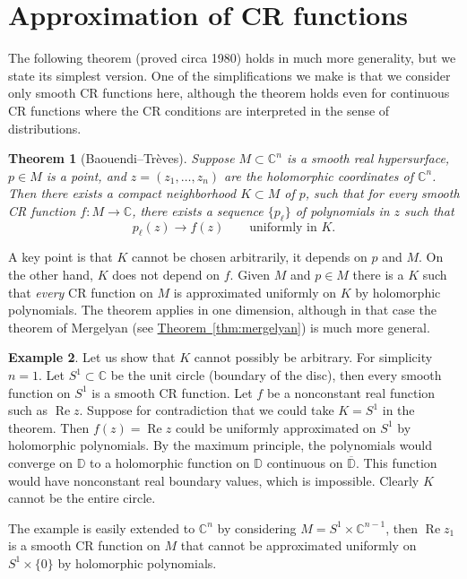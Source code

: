 \documentclass[12pt,openany]{book}
\renewcommand{\Re}{\operatorname{Re}}
\newcommand{\C}{{\mathbb{C}}}
\newcommand{\D}{{\mathbb{D}}}
\theoremstyle{plain}
\newtheorem{thm}{Theorem}[section]
\theoremstyle{remark}
\theoremstyle{definition}
\theoremstyle{exercise}
\theoremstyle{example}
\newtheorem{example}[thm]{Example}
\newcommand{\thmref}[1]{\hyperref[#1]{Theorem~\ref*{#1}}}
\begin{document}
\section{Approximation of CR functions}

The following theorem (proved circa 1980) holds in much more generality, but
we state its simplest version.  One of the simplifications we make is that
we consider only smooth CR functions here, although the theorem holds even
for continuous CR functions where the CR conditions are interpreted in the
sense of distributions.

\begin{thm}[Baouendi--Tr{\`e}ves]%
\pagebreak[2]
Suppose $M \subset \C^n$ is a smooth real hypersurface,
$p \in M$ is a point,
and
$z=(z_1,\dots,z_n)$ are the holomorphic coordinates of $\C^n$.
Then there exists a compact
neighborhood $K \subset M$ of $p$, such that for every smooth CR function $f \colon M \to \C$,
there exists a sequence $\{ p_\ell \}$ of polynomials in $z$ such that
\begin{equation*}
p_\ell(z) \to f(z)
\qquad \text{uniformly in $K$.}
\end{equation*}
\end{thm}

A key point is that $K$ cannot be chosen arbitrarily, it depends on $p$ and $M$.
On the other hand, $K$ does not depend on $f$.  Given $M$ and $p \in M$
there is a $K$ such that \emph{every} CR function on $M$ is approximated
uniformly on $K$ by holomorphic polynomials.  The theorem applies in one
dimension, although in that case the theorem of Mergelyan
(see \thmref{thm:mergelyan}) is much more general.

\begin{example}
Let us show that $K$ cannot possibly be arbitrary.  For simplicity $n=1$.
Let $S^1 \subset \C$ be the unit circle (boundary of the disc),
then every smooth function on $S^1$ is a smooth CR function.  Let $f$
be a nonconstant real function such as $\Re z$.  Suppose for
contradiction that we could take $K = S^1$ in the theorem.  Then $f(z) = \Re
z$ could be uniformly
approximated on $S^1$ by holomorphic polynomials.
By the maximum principle, the
polynomials would converge on $\D$ to a holomorphic function on $\D$
continuous on $\overline{\D}$.  This function would have nonconstant real boundary values,
which is impossible.  Clearly $K$ cannot be the entire circle.

The example is easily extended to $\C^n$
by considering
$M = S^1 \times \C^{n-1}$, then $\Re z_1$ is a smooth CR function on $M$ that cannot be
approximated uniformly on $S^1 \times \{ 0 \}$ by holomorphic polynomials.
\end{example}
\end{document}
